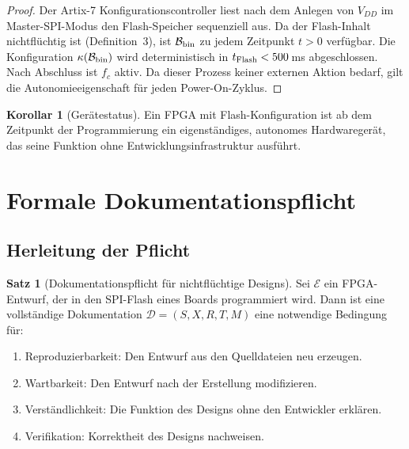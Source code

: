 ﻿\documentclass[a4paper,12pt]{article}
\theoremstyle{definition}
\newtheorem{satz}{Satz}
\newtheorem{korollar}{Korollar}
\begin{document}
\begin{proof}
    Der Artix-7 Konfigurationscontroller liest nach dem Anlegen von $V_{DD}$
    im Master-SPI-Modus den Flash-Speicher sequenziell aus. Da der Flash-Inhalt
    nichtflüchtig ist (Definition~3), ist $\mathcal{B}_{\rm bin}$ zu jedem
    Zeitpunkt $t > 0$ verfügbar. Die Konfiguration $\kappa(\mathcal{B}_{\rm bin})$
    wird deterministisch in $t_{\rm Flash} < 500$\,ms abgeschlossen.
    Nach Abschluss ist $f_c$ aktiv. Da dieser Prozess keiner externen
    Aktion bedarf, gilt die Autonomieeigenschaft für jeden Power-On-Zyklus.
    \qedhere
\end{proof}

\begin{korollar}[Gerätestatus]
    Ein FPGA mit Flash-Konfiguration ist ab dem Zeitpunkt der Programmierung
    ein eigenständiges, autonomes Hardwaregerät, das seine Funktion ohne
    Entwicklungsinfrastruktur ausführt.
\end{korollar}

\section{Formale Dokumentationspflicht}
\label{sec:pflicht}

\subsection{Herleitung der Pflicht}

\begin{satz}[Dokumentationspflicht für nichtflüchtige Designs]
    \label{satz:pflicht}
    Sei $\mathcal{E}$ ein FPGA-Entwurf, der in den SPI-Flash eines Boards
    programmiert wird. Dann ist eine vollständige Dokumentation
    $\mathcal{D} = (S, X, R, T, M)$ eine notwendige Bedingung für:
    \begin{enumerate}
        \item Reproduzierbarkeit: Den Entwurf aus den Quelldateien neu erzeugen.
        \item Wartbarkeit: Den Entwurf nach der Erstellung modifizieren.
        \item Verständlichkeit: Die Funktion des Designs ohne den Entwickler erklären.
        \item Verifikation: Korrektheit des Designs nachweisen.
    \end{enumerate}
\end{satz}
\end{document}
